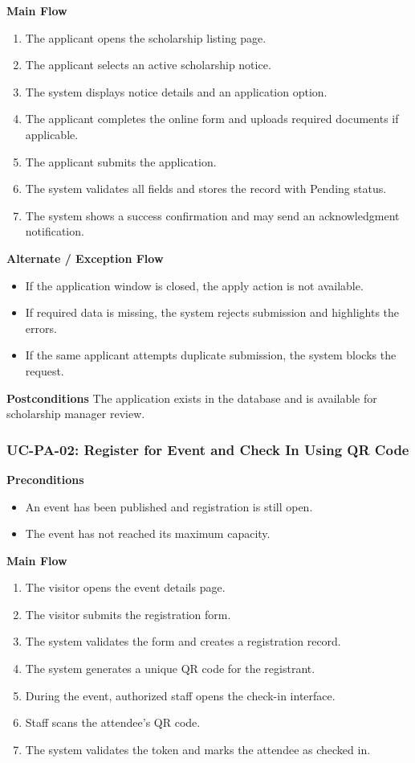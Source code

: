 \documentclass[12pt,a4paper]{article}
\begin{document}
\textbf{Main Flow}
\begin{enumerate}[nosep]
\item The applicant opens the scholarship listing page.
\item The applicant selects an active scholarship notice.
\item The system displays notice details and an application option.
\item The applicant completes the online form and uploads required documents if applicable.
\item The applicant submits the application.
\item The system validates all fields and stores the record with Pending status.
\item The system shows a success confirmation and may send an acknowledgment notification.
\end{enumerate}

\textbf{Alternate / Exception Flow}
\begin{itemize}[nosep]
\item If the application window is closed, the apply action is not available.
\item If required data is missing, the system rejects submission and highlights the errors.
\item If the same applicant attempts duplicate submission, the system blocks the request.
\end{itemize}

\textbf{Postconditions}
The application exists in the database and is available for scholarship manager review.

\subsubsection*{UC-PA-02: Register for Event and Check In Using QR Code}

\textbf{Preconditions}
\begin{itemize}[nosep]
\item An event has been published and registration is still open.
\item The event has not reached its maximum capacity.
\end{itemize}

\textbf{Main Flow}
\begin{enumerate}[nosep]
\item The visitor opens the event details page.
\item The visitor submits the registration form.
\item The system validates the form and creates a registration record.
\item The system generates a unique QR code for the registrant.
\item During the event, authorized staff opens the check-in interface.
\item Staff scans the attendee's QR code.
\item The system validates the token and marks the attendee as checked in.
\end{enumerate}
\end{document}
